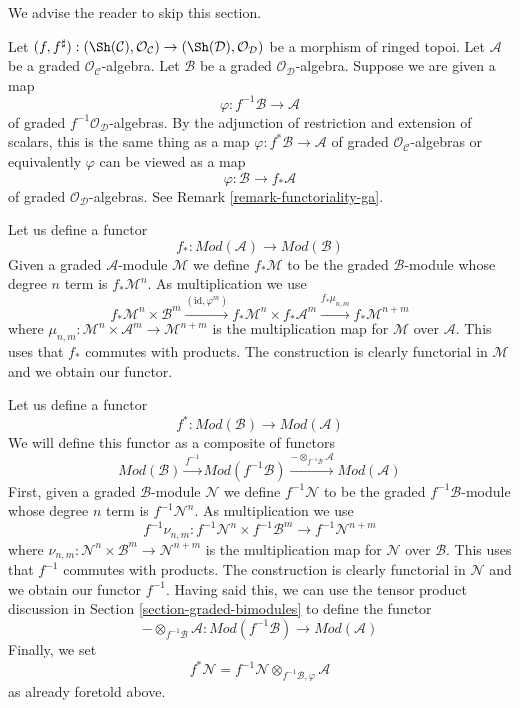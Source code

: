 \noindent
We advise the reader to skip this section.

\medskip\noindent
Let $(f, f^\sharp) : (\Sh(\mathcal{C}), \mathcal{O}_\mathcal{C})
\to (\Sh(\mathcal{D}), \mathcal{O}_\mathcal{D})$
be a morphism of ringed topoi. Let $\mathcal{A}$ be a
graded $\mathcal{O}_\mathcal{C}$-algebra. Let $\mathcal{B}$ be a
graded $\mathcal{O}_\mathcal{D}$-algebra.
Suppose we are given a map
$$
\varphi : f^{-1}\mathcal{B} \to \mathcal{A}
$$
of graded $f^{-1}\mathcal{O}_\mathcal{D}$-algebras.
By the adjunction of restriction and extension of scalars, this
is the same thing as a map $\varphi : f^*\mathcal{B} \to \mathcal{A}$
of graded $\mathcal{O}_\mathcal{C}$-algebras or equivalently
$\varphi$ can be viewed as a map
$$
\varphi : \mathcal{B} \to f_*\mathcal{A}
$$
of graded $\mathcal{O}_\mathcal{D}$-algebras.
See Remark \ref{remark-functoriality-ga}.

\medskip\noindent
Let us define a functor
$$
f_* :
\textit{Mod}(\mathcal{A})
\longrightarrow
\textit{Mod}(\mathcal{B})
$$
Given a graded $\mathcal{A}$-module $\mathcal{M}$ we define
$f_*\mathcal{M}$ to be the graded $\mathcal{B}$-module
whose degree $n$ term is $f_*\mathcal{M}^n$. As multiplication
we use
$$
f_*\mathcal{M}^n \times \mathcal{B}^m
\xrightarrow{(\text{id}, \varphi^m)}
f_*\mathcal{M}^n \times f_*\mathcal{A}^m
\xrightarrow{f_*\mu_{n, m}}
f_*\mathcal{M}^{n + m}
$$
where $\mu_{n, m} : \mathcal{M}^n \times \mathcal{A}^m
\to \mathcal{M}^{n + m}$ is the multiplication map for $\mathcal{M}$
over $\mathcal{A}$. This uses that $f_*$ commutes with products.
The construction is clearly functorial in
$\mathcal{M}$ and we obtain our functor.

\medskip\noindent
Let us define a functor
$$
f^* :
\textit{Mod}(\mathcal{B})
\longrightarrow
\textit{Mod}(\mathcal{A})
$$
We will define this functor as a composite of functors
$$
\textit{Mod}(\mathcal{B})
\xrightarrow{f^{-1}}
\textit{Mod}(f^{-1}\mathcal{B})
\xrightarrow{ - \otimes_{f^{-1}\mathcal{B}} \mathcal{A}}
\textit{Mod}(\mathcal{A})
$$
First, given a graded $\mathcal{B}$-module $\mathcal{N}$ we define
$f^{-1}\mathcal{N}$ to be the graded $f^{-1}\mathcal{B}$-module
whose degree $n$ term is $f^{-1}\mathcal{N}^n$. As multiplication
we use
$$
f^{-1}\nu_{n, m} :
f^{-1}\mathcal{N}^n \times f^{-1}\mathcal{B}^m
\longrightarrow
f^{-1}\mathcal{N}^{n + m}
$$
where $\nu_{n, m} : \mathcal{N}^n \times \mathcal{B}^m
\to \mathcal{N}^{n + m}$ is the multiplication map for $\mathcal{N}$
over $\mathcal{B}$. This uses that $f^{-1}$ commutes with products.
The construction is clearly functorial in
$\mathcal{N}$ and we obtain our functor $f^{-1}$.
Having said this, we can use the tensor
product discussion in Section \ref{section-graded-bimodules}
to define the functor
$$
- \otimes_{f^{-1}\mathcal{B}} \mathcal{A} :
\textit{Mod}(f^{-1}\mathcal{B})
\longrightarrow
\textit{Mod}(\mathcal{A})
$$
Finally, we set
$$
f^*\mathcal{N} =
f^{-1}\mathcal{N} \otimes_{f^{-1}\mathcal{B}, \varphi} \mathcal{A}
$$
as already foretold above.

